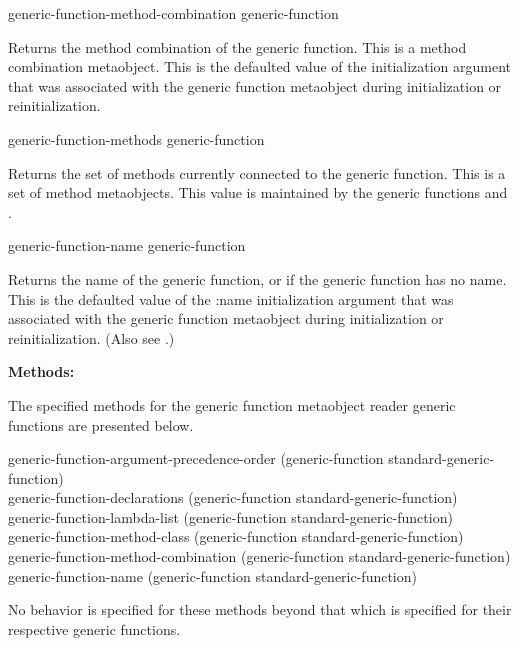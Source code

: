 \begin{defun}
generic-function-method-combination generic-function

Returns the method combination of the generic function. This is a method
combination metaobject. This is the defaulted value of the 
initialization argument that was associated with the generic function metaobject
during initialization or reinitialization.
\end{defun}

\begin{defun}
generic-function-methods generic-function

Returns the set of methods currently connected to the generic function. This is
a set of method metaobjects. This value is maintained by the generic functions
 and .
\end{defun}

\begin{defun}
generic-function-name generic-function

Returns the name of the generic function, or  if the generic function has no
name. This is the defaulted value of the :name initialization argument that was
associated with the generic function metaobject during initialization or
reinitialization. (Also see .)
\end{defun}

\textbf{Methods:}

The specified methods for the generic function metaobject reader generic
functions are presented below.

\begin{defun}
generic-function-argument-precedence-order (generic-function standard-generic-function) \\
generic-function-declarations (generic-function standard-generic-function) \\
generic-function-lambda-list (generic-function standard-generic-function) \\
generic-function-method-class (generic-function standard-generic-function) \\
generic-function-method-combination (generic-function standard-generic-function) \\
generic-function-name (generic-function standard-generic-function) 

No behavior is specified for these methods beyond that which is specified for
their respective generic functions.
\end{defun}

